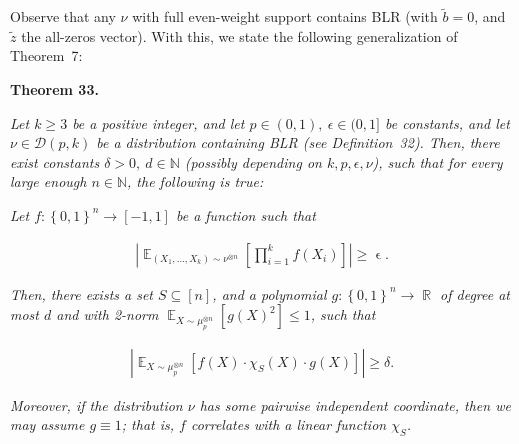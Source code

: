 


Observe that any $\nu$ with full even-weight support contains BLR (with $\tilde{b}=0$, and $\tilde{z}$ the all-zeros vector).
With this, we state the following generalization of Theorem 7:\par





\par\medskip\noindent\textbf{
\textbf{Theorem 33}\textbf{.}
}\par



\emph{Let $k\geqslant 3$ be a positive integer, and let $p\in(0,1),\ \epsilon\in(0,1]$ be constants, and let $\nu\in\mathcal{D}(p,k)$ be a distribution containing BLR (see Definition 32).
Then, there exist constants $\delta>0,\ d\in\mathbb{N}$ (possibly depending on $k,p,\epsilon,\nu$), such that for every large enough $n\in\mathbb{N}$, the following is true:}\par




\emph{Let $f:\left\{0,1\right\}^{n}\to[-1,1]$ be a function such that}\par


\[\begin{gathered}
\left|\mathop{\mathbb{E}}_{(X_{1},\dots,X_{k})\sim\nu^{\otimes n}}\left[\prod_{i=1}^{k}f(X_{i})\right]\right|\geqslant\mathop{\epsilon}.
\end{gathered}\]


\emph{Then, there exists a set $S\subseteq[n]$, and a polynomial $g:\left\{0,1\right\}^{n}\to\mathop{\mathbb{R}}$ of degree at most $d$ and with 2-norm $\mathop{\mathbb{E}}_{X\sim\mu_{p}^{\otimes n}}\left[g(X)^{2}\right]\leqslant 1$, such that}\par


\[\begin{gathered}
\left|\mathop{\mathbb{E}}_{X\sim\mu_{p}^{\otimes n}}\left[f(X)\cdot\chi_{S}(X)\cdot g(X)\right]\right|\geqslant\delta.
\end{gathered}\]




\emph{Moreover, if the distribution $\nu$ has some pairwise independent coordinate, then we may assume $g\equiv 1$; that is, $f$ correlates with a linear function $\chi_{S}$.}\par



